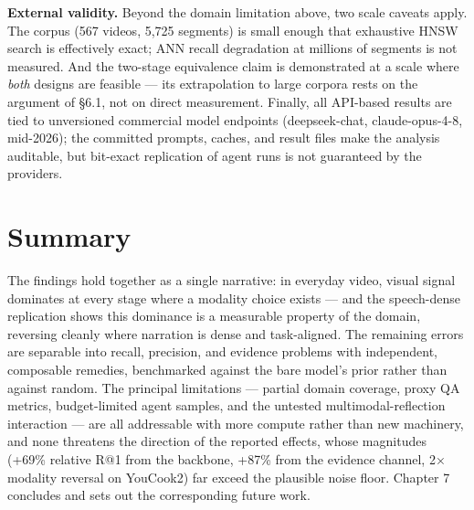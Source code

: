 \textbf{External validity.} Beyond the domain limitation above, two
scale caveats apply. The corpus (567 videos, 5,725 segments) is small
enough that exhaustive HNSW search is effectively exact; ANN recall
degradation at millions of segments is not measured. And the two-stage
equivalence claim is demonstrated at a scale where \emph{both} designs
are feasible --- its extrapolation to large corpora rests on the
argument of §6.1, not on direct measurement. Finally, all API-based
results are tied to unversioned commercial model endpoints
(deepseek-chat, claude-opus-4-8, mid-2026); the committed prompts,
caches, and result files make the analysis auditable, but bit-exact
replication of agent runs is not guaranteed by the providers.

\section{Summary}

The findings hold together as a single narrative: in everyday video,
visual signal dominates at every stage where a modality choice exists
--- and the speech-dense replication shows this dominance is a
measurable property of the domain, reversing cleanly where narration is
dense and task-aligned. The remaining errors are separable into recall,
precision, and evidence problems with independent, composable remedies,
benchmarked against the bare model's prior rather than against random.
The principal limitations --- partial domain coverage, proxy QA metrics,
budget-limited agent samples, and the untested multimodal-reflection
interaction --- are all addressable with more compute rather than new
machinery, and none threatens the direction of the reported effects,
whose magnitudes (+69\% relative R@1 from the backbone, +87\% from the
evidence channel, 2× modality reversal on YouCook2) far exceed the
plausible noise floor. Chapter 7 concludes and sets out the
corresponding future work.

